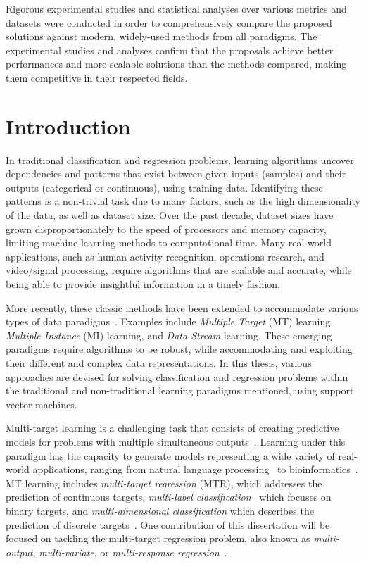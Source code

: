 \documentclass[reqno]{vcuthesis}
\numberwithin{equation}{chapter}
\begin{document}
{Rigorous experimental studies and statistical analyses over various metrics and datasets were conducted in order to comprehensively compare the proposed solutions against modern, widely-used methods from all paradigms. The experimental studies and analyses confirm that the proposals achieve better performances and more scalable solutions than the methods compared, making them competitive in their respected fields.
}

\tableofcontents
\listofalgorithmsvcu
\listoftables
\listoffigures
\clearpage


\chapter{Introduction \label{chap:chapintro}}
In traditional classification and regression problems, learning algorithms uncover dependencies and patterns that exist between given inputs (samples) and their outputs (categorical or continuous), using training data. Identifying these patterns is a non-trivial task due to many factors, such as the high dimensionality of the data, as well as dataset size. Over the past decade, dataset sizes have grown disproportionately to the speed of processors and memory capacity, limiting machine learning methods to computational time. Many real-world applications, such as human activity recognition, operations research, and video/signal processing, require algorithms that are scalable and accurate, while being able to provide insightful information in a timely fashion.

More recently, these classic methods have been extended to accommodate various types of data paradigms~\cite{Tan2005IDM1095618}. Examples include \textit{Multiple Target} (MT) learning, \textit{Multiple Instance} (MI) learning, and \textit{Data Stream} learning. These emerging paradigms require algorithms to be robust, while accommodating and exploiting their different and complex data representations. In this thesis, various approaches are devised for solving classification and regression problems within the traditional and non-traditional learning paradigms mentioned, using support vector machines. 

Multi-target learning is a challenging task that consists of creating predictive models for problems with multiple simultaneous outputs~\cite{Baxter1997,Caruana1997,thrun1996learning}. Learning under this paradigm has the capacity to generate models representing a wide variety of real-world applications, ranging from natural language processing~\cite{Jeong2009} to bioinformatics~\cite{Lui2010}. MT learning includes \textit{multi-target regression} (MTR), which addresses the prediction of continuous targets, \textit{multi-label classification}~\cite{Zhang20141819} which focuses on binary targets, and \textit{multi-dimensional classification} which describes the prediction of discrete targets~\cite{Borchani2015}. One contribution of this dissertation will be focused on tackling the multi-target regression problem, also known as \textit{multi-output}, \textit{multi-variate}, or \textit{multi-response regression}~\cite{Borchani2015}. 
\end{document}
